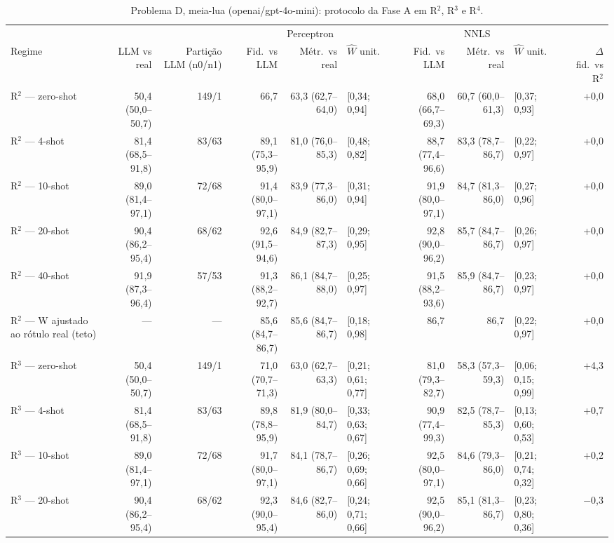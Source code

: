 \begin{table}[htbp]
\centering
\footnotesize
\caption{Problema D, meia-lua (openai/gpt-4o-mini): protocolo da Fase A em R$^2$, R$^3$ e R$^4$.}
\label{tab:T3_D_gpt4mini}
\begin{tabular}{lrrrrlrrlr}
\toprule
 &  &  & \multicolumn{3}{c}{Perceptron} & \multicolumn{3}{c}{NNLS} &  \\ \cmidrule(lr){4-6} \cmidrule(lr){7-9}
Regime & LLM vs real & Partição LLM (n0/n1) & Fid.\ vs LLM & Métr.\ vs real & $\hat{W}$ unit. & Fid.\ vs LLM & Métr.\ vs real & $\hat{W}$ unit. & $\Delta$ fid.\ vs R$^2$ \\
\midrule
R$^2$ — zero-shot & 50,4 (50,0–50,7) & 149/1 & 66,7 & 63,3 (62,7–64,0) & [0,34; 0,94] & 68,0 (66,7–69,3) & 60,7 (60,0–61,3) & [0,37; 0,93] & +0,0 \\
R$^2$ — 4-shot & 81,4 (68,5–91,8) & 83/63 & 89,1 (75,3–95,9) & 81,0 (76,0–85,3) & [0,48; 0,82] & 88,7 (77,4–96,6) & 83,3 (78,7–86,7) & [0,22; 0,97] & +0,0 \\
R$^2$ — 10-shot & 89,0 (81,4–97,1) & 72/68 & 91,4 (80,0–97,1) & 83,9 (77,3–86,0) & [0,31; 0,94] & 91,9 (80,0–97,1) & 84,7 (81,3–86,0) & [0,27; 0,96] & +0,0 \\
R$^2$ — 20-shot & 90,4 (86,2–95,4) & 68/62 & 92,6 (91,5–94,6) & 84,9 (82,7–87,3) & [0,29; 0,95] & 92,8 (90,0–96,2) & 85,7 (84,7–86,7) & [0,26; 0,97] & +0,0 \\
R$^2$ — 40-shot & 91,9 (87,3–96,4) & 57/53 & 91,3 (88,2–92,7) & 86,1 (84,7–88,0) & [0,25; 0,97] & 91,5 (88,2–93,6) & 85,9 (84,7–86,7) & [0,23; 0,97] & +0,0 \\
R$^2$ — W ajustado ao rótulo real (teto) & — & — & 85,6 (84,7–86,7) & 85,6 (84,7–86,7) & [0,18; 0,98] & 86,7 & 86,7 & [0,22; 0,97] & +0,0 \\
\midrule
R$^3$ — zero-shot & 50,4 (50,0–50,7) & 149/1 & 71,0 (70,7–71,3) & 63,0 (62,7–63,3) & [0,21; 0,61; 0,77] & 81,0 (79,3–82,7) & 58,3 (57,3–59,3) & [0,06; 0,15; 0,99] & +4,3 \\
R$^3$ — 4-shot & 81,4 (68,5–91,8) & 83/63 & 89,8 (78,8–95,9) & 81,9 (80,0–84,7) & [0,33; 0,63; 0,67] & 90,9 (77,4–99,3) & 82,5 (78,7–85,3) & [0,13; 0,60; 0,53] & +0,7 \\
R$^3$ — 10-shot & 89,0 (81,4–97,1) & 72/68 & 91,7 (80,0–97,1) & 84,1 (78,7–86,7) & [0,26; 0,69; 0,66] & 92,5 (80,0–97,1) & 84,6 (79,3–86,0) & [0,21; 0,74; 0,32] & +0,2 \\
R$^3$ — 20-shot & 90,4 (86,2–95,4) & 68/62 & 92,3 (90,0–95,4) & 84,6 (82,7–86,0) & [0,24; 0,71; 0,66] & 92,5 (90,0–96,2) & 85,1 (81,3–86,7) & [0,23; 0,80; 0,36] & $-$0,3 \\

\end{tabular}
\end{table}
